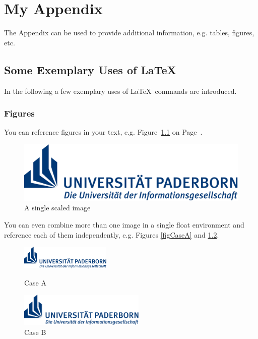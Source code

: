 \chapter{My Appendix}\label{secAppendixA}

The Appendix can be used to provide additional information, e.g. tables, figures, etc.


\section{Some Exemplary Uses of \LaTeX}

In the following a few exemplary uses of \LaTeX~commands are introduced.

\subsection{Figures}\label{secFigures}

You can reference figures in your text, e.g. Figure~\ref{figUniKralle} on Page~\pageref{figUniKralle}.

\begin{figure}[htb]
	\centering
	\includegraphics[scale=0.5]{Images/TitlePage/uni-logo}
	\caption{A single scaled image}
	\label{figUniKralle}
\end{figure}



You can even combine more than one image in a single float environment and reference each of them independently, e.g. Figures \ref{figCaseA} and \ref{figCaseB}.

\begin{figure}[h]
	\centering
  \begin{minipage}[t]{.47\textwidth}
    \centering
    \includegraphics[width=4.3cm]{Images/TitlePage/uni-logo} 
    \caption{Case A}
    \label{figCaseA}
  \end{minipage}%
  \hfill
  \begin{minipage}[t]{.47\textwidth}
    \centering
    \includegraphics[width=6cm]{Images/TitlePage/uni-logo}
    \caption{Case B}
    \label{figCaseB}
  \end{minipage}
\end{figure}

